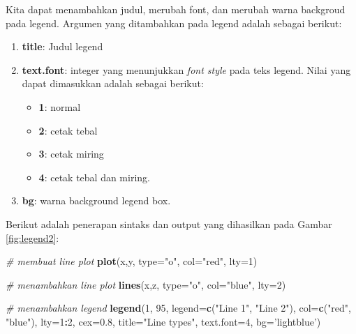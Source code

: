 \documentclass[]{book}
\newenvironment{Shaded}{\begin{snugshade}}{\end{snugshade}}
\newcommand{\CommentTok}[1]{\textcolor[rgb]{0.56,0.35,0.01}{\textit{#1}}}
\newcommand{\DataTypeTok}[1]{\textcolor[rgb]{0.13,0.29,0.53}{#1}}
\newcommand{\DecValTok}[1]{\textcolor[rgb]{0.00,0.00,0.81}{#1}}
\newcommand{\FloatTok}[1]{\textcolor[rgb]{0.00,0.00,0.81}{#1}}
\newcommand{\KeywordTok}[1]{\textcolor[rgb]{0.13,0.29,0.53}{\textbf{#1}}}
\newcommand{\NormalTok}[1]{#1}
\newcommand{\OperatorTok}[1]{\textcolor[rgb]{0.81,0.36,0.00}{\textbf{#1}}}
\newcommand{\StringTok}[1]{\textcolor[rgb]{0.31,0.60,0.02}{#1}}
\providecommand{\tightlist}{%
  \setlength{\itemsep}{0pt}\setlength{\parskip}{0pt}}
\theoremstyle{definition}
\theoremstyle{definition}
\theoremstyle{definition}
\theoremstyle{remark}
\begin{document}
Kita dapat menambahkan judul, merubah font, dan merubah warna backgroud pada legend. Argumen yang ditambahkan pada legend adalah sebagai berikut:

\begin{enumerate}
\def\labelenumi{\alph{enumi}.}
\tightlist
\item
  \textbf{title}: Judul legend
\item
  \textbf{text.font}: integer yang menunjukkan \emph{font style} pada teks legend. Nilai yang dapat dimasukkan adalah sebagai berikut:

  \begin{itemize}
  \tightlist
  \item
    \textbf{1}: normal
  \item
    \textbf{2}: cetak tebal
  \item
    \textbf{3}: cetak miring
  \item
    \textbf{4}: cetak tebal dan miring.
  \end{itemize}
\item
  \textbf{bg}: warna background legend box.
\end{enumerate}

Berikut adalah penerapan sintaks dan output yang dihasilkan pada Gambar \ref{fig:legend2}:

\begin{Shaded}
\begin{Highlighting}[]
\CommentTok{# membuat line plot}
\KeywordTok{plot}\NormalTok{(x,y, }\DataTypeTok{type=}\StringTok{"o"}\NormalTok{, }\DataTypeTok{col=}\StringTok{"red"}\NormalTok{, }\DataTypeTok{lty=}\DecValTok{1}\NormalTok{)}

\CommentTok{# menambahkan line plot}
\KeywordTok{lines}\NormalTok{(x,z, }\DataTypeTok{type=}\StringTok{"o"}\NormalTok{, }\DataTypeTok{col=}\StringTok{"blue"}\NormalTok{, }\DataTypeTok{lty=}\DecValTok{2}\NormalTok{)}

\CommentTok{# menambahkan legend}
\KeywordTok{legend}\NormalTok{(}\DecValTok{1}\NormalTok{, }\DecValTok{95}\NormalTok{, }\DataTypeTok{legend=}\KeywordTok{c}\NormalTok{(}\StringTok{"Line 1"}\NormalTok{, }\StringTok{"Line 2"}\NormalTok{),}
       \DataTypeTok{col=}\KeywordTok{c}\NormalTok{(}\StringTok{"red"}\NormalTok{, }\StringTok{"blue"}\NormalTok{), }\DataTypeTok{lty=}\DecValTok{1}\OperatorTok{:}\DecValTok{2}\NormalTok{, }\DataTypeTok{cex=}\FloatTok{0.8}\NormalTok{,}
       \DataTypeTok{title=}\StringTok{"Line types"}\NormalTok{, }\DataTypeTok{text.font=}\DecValTok{4}\NormalTok{, }\DataTypeTok{bg=}\StringTok{'lightblue'}\NormalTok{)}
\end{Highlighting}
\end{Shaded}
\end{document}
